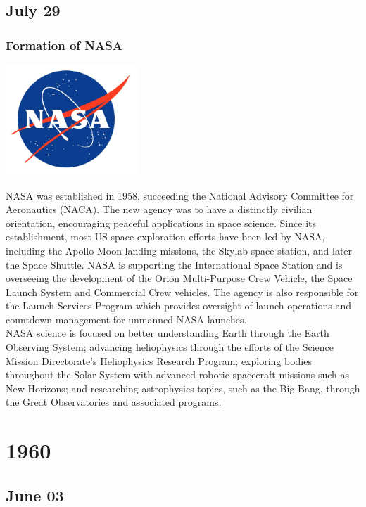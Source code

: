 \documentclass[11pt]{report}
\begin{document}
\section{July 29}
\subsection{Formation of NASA}
\vspace{2mm}\begin{center}\includegraphics[width=5cm]{./img/nasaLogo.jpg}\end{center}
NASA was established in 1958, succeeding the National Advisory Committee for Aeronautics (NACA). The new agency was to have a distinctly civilian orientation, encouraging peaceful applications in space science. Since its establishment, most US space exploration efforts have been led by NASA, including the Apollo Moon landing missions, the Skylab space station, and later the Space Shuttle. NASA is supporting the International Space Station and is overseeing the development of the Orion Multi-Purpose Crew Vehicle, the Space Launch System and Commercial Crew vehicles. The agency is also responsible for the Launch Services Program which provides oversight of launch operations and countdown management for unmanned NASA launches.\\
\indent NASA science is focused on better understanding Earth through the Earth Observing System; advancing heliophysics through the efforts of the Science Mission Directorate's Heliophysics Research Program; exploring bodies throughout the Solar System with advanced robotic spacecraft missions such as New Horizons; and researching astrophysics topics, such as the Big Bang, through the Great Observatories and associated programs.

\chapter{1960}
\section{June 03}
\end{document}
